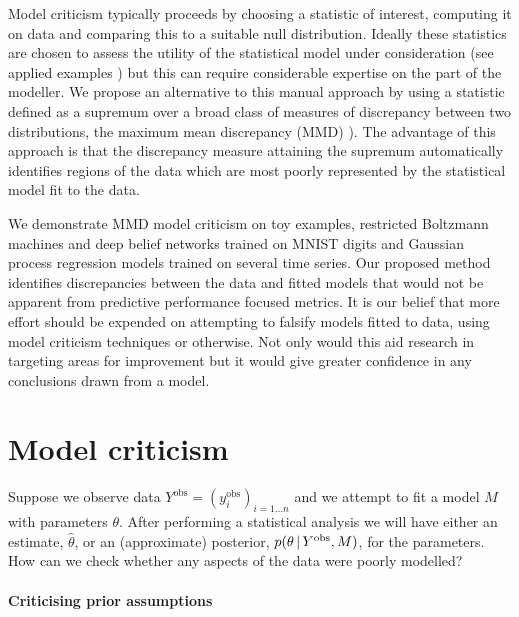 \documentclass{article} %
\begin{document}
Model criticism typically proceeds by choosing a statistic of interest, computing it on data and comparing this to a suitable null distribution.
Ideally these statistics are chosen to assess the utility of the statistical model under consideration (see applied examples \citep[e.g.][]{Gelman2013-st}) but this can require considerable expertise on the part of the modeller.
We propose an alternative to this manual approach by using a statistic defined as a supremum over a broad class of measures of discrepancy between two distributions, the maximum mean discrepancy (MMD) \citep[e.g.][]{Gretton2008-gs}).
The advantage of this approach is that the discrepancy measure attaining the supremum automatically identifies regions of the data which are most poorly represented by the statistical model fit to the data.

We demonstrate MMD model criticism on toy examples, restricted Boltzmann machines and deep belief networks trained on MNIST digits and Gaussian process regression models trained on several time series.
Our proposed method identifies discrepancies between the data and fitted models that would not be apparent from predictive performance focused metrics.
It is our belief that more effort should be expended on attempting to falsify models fitted to data, using model criticism techniques or otherwise.
Not only would this aid research in targeting areas for improvement but it would give greater confidence in any conclusions drawn from a model.

\section{Model criticism}
\label{sec:model-crit-general}

Suppose we observe data ${Y^\textrm{obs} = (y^\textrm{obs}_i)_{i=1\ldots n}}$ and we attempt to fit a model $M$ with parameters $\theta$.
After performing a statistical analysis we will have either an estimate, $\hat\theta$, or an (approximate) posterior, $p(\theta \,|\, Y^\textrm{obs}, M)$, for the parameters.
How can we check whether any aspects of the data were poorly modelled?

\paragraph{Criticising prior assumptions}
\end{document}
